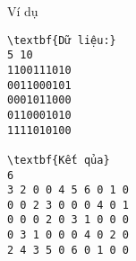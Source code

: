 Ví dụ
\begin{verbatim}
\textbf{Dữ liệu:}
5 10
1100111010 
0011000101 
0001011000 
0110001010 
1111010100

\textbf{Kết qủa}
6
3 2 0 0 4 5 6 0 1 0 
0 0 2 3 0 0 0 4 0 1 
0 0 0 2 0 3 1 0 0 0 
0 3 1 0 0 0 4 0 2 0 
2 4 3 5 0 6 0 1 0 0
\end{verbatim}
